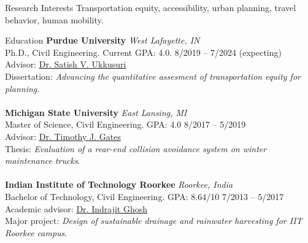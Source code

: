 \documentclass{CV} %
\begin{document}
\begin{rSection}{Research Interests}
    Transportation equity, accessibility, urban planning, travel behavior, human mobility.
\end{rSection}

\begin{rSection}{Education}
    {\bf Purdue University} \hfill {\em West Lafayette, IN} 
    \\ Ph.D., Civil Engineering. Current GPA: 4.0. \hfill {8/2019 – 7/2024 (expecting)}
    \\ Advisor: \href{http://www.satishukkusuri.com/}{Dr. Satish V. Ukkusuri}
    \\ Dissertation: \emph{Advancing the quantitative assesment of transportation equity for planning}. \\
    \\ {\bf Michigan State University} \hfill {\em East Lansing, MI} 
    \\ Master of Science, Civil Engineering. GPA: 4.0 \hfill {8/2017 – 5/2019}
    \\ Advisor: \href{https://www.egr.msu.edu/people/profile/gatestim}{Dr. Timothy J. Gates}
    \\ Thesis: \emph{Evaluation of a rear-end collision avoidance system on winter maintenance trucks}. \\
    \\ {\bf Indian Institute of Technology Roorkee} \hfill {\em Roorkee, India}
    \\ Bachelor of Technology, Civil Engineering. GPA: 8.64/10 \hfill {7/2013 – 5/2017}
    \\ Academic advisor: \href{https://civil.iitr.ac.in/CE?Uid=indrafce}{Dr. Indrajit Ghosh}
    \\ Major project: \emph{Design of sustainable drainage and rainwater harvesting for IIT Roorkee campus}.
\end{rSection}
\end{document}

